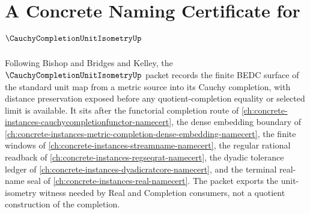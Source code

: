 \chapter{A Concrete Naming Certificate for $\CauchyCompletionUnitIsometryUp$}
\label{ch:concrete-instances-cauchy-completion-unit-isometry-namecert}

Following Bishop and Bridges and Kelley, the $\CauchyCompletionUnitIsometryUp$
packet records the finite BEDC surface of the standard unit map from a metric
source into its Cauchy completion, with distance preservation exposed before
any quotient-completion equality or selected limit is available. It sits after
the functorial completion route of
\autoref{ch:concrete-instances-cauchycompletionfunctor-namecert}, the dense
embedding boundary of
\autoref{ch:concrete-instances-metric-completion-dense-embedding-namecert},
the finite windows of \autoref{ch:concrete-instances-streamname-namecert}, the
regular rational readback of
\autoref{ch:concrete-instances-regseqrat-namecert}, the dyadic tolerance
ledger of \autoref{ch:concrete-instances-dyadicratcore-namecert}, and the
terminal real-name seal of \autoref{ch:concrete-instances-real-namecert}. The
packet exports the unit-isometry witness needed by Real and Completion
consumers, not a quotient construction of the completion.

